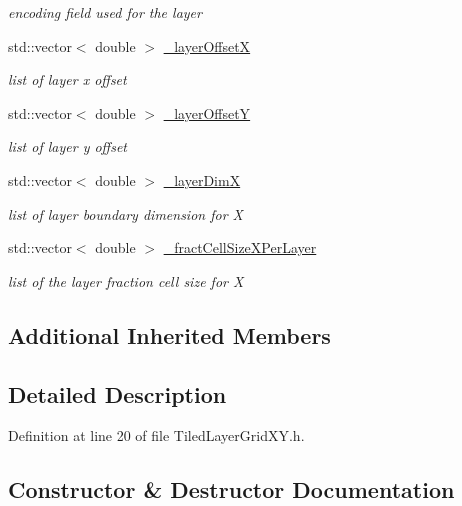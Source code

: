 \begin{DoxyCompactItemize}
\begin{DoxyCompactList}\small\item\em encoding field used for the layer \end{DoxyCompactList}\item 
std\+::vector$<$ double $>$ \hyperlink{class_d_d4hep_1_1_d_d_segmentation_1_1_tiled_layer_grid_x_y_a6974df570df9c6cd533b17a78f3cb0d3}{\+\_\+layer\+OffsetX}
\begin{DoxyCompactList}\small\item\em list of layer x offset \end{DoxyCompactList}\item 
std\+::vector$<$ double $>$ \hyperlink{class_d_d4hep_1_1_d_d_segmentation_1_1_tiled_layer_grid_x_y_a0ee4e15bd3807f5ecccc82ffb7962377}{\+\_\+layer\+OffsetY}
\begin{DoxyCompactList}\small\item\em list of layer y offset \end{DoxyCompactList}\item 
std\+::vector$<$ double $>$ \hyperlink{class_d_d4hep_1_1_d_d_segmentation_1_1_tiled_layer_grid_x_y_a6ce81c79c43efdb092b454a1047fd666}{\+\_\+layer\+DimX}
\begin{DoxyCompactList}\small\item\em list of layer boundary dimension for X \end{DoxyCompactList}\item 
std\+::vector$<$ double $>$ \hyperlink{class_d_d4hep_1_1_d_d_segmentation_1_1_tiled_layer_grid_x_y_a459d90c7d9a34184e093dd0ce01e5157}{\+\_\+fract\+Cell\+Size\+X\+Per\+Layer}
\begin{DoxyCompactList}\small\item\em list of the layer fraction cell size for X \end{DoxyCompactList}\end{DoxyCompactItemize}
\subsection*{Additional Inherited Members}


\subsection{Detailed Description}


Definition at line 20 of file Tiled\+Layer\+Grid\+X\+Y.\+h.



\subsection{Constructor \& Destructor Documentation}
\hypertarget{class_d_d4hep_1_1_d_d_segmentation_1_1_tiled_layer_grid_x_y_acbf674bb93ded0eedfa0d57426af8400}{}\label{class_d_d4hep_1_1_d_d_segmentation_1_1_tiled_layer_grid_x_y_acbf674bb93ded0eedfa0d57426af8400} 

